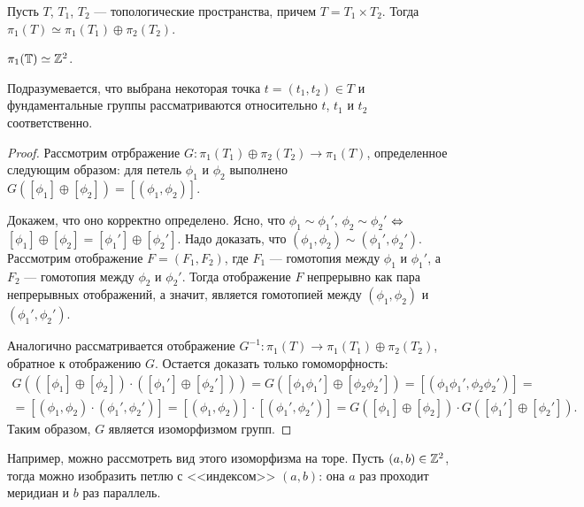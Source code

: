\documentclass[main]{subfiles}
\begin{document}
\begin{theorem}
	Пусть $ T $, $ T_1 $, $ T_2 $ --- топологические пространства, причем $ T = T_1 \times T_2 $.
	Тогда $ \pi_1(T) \simeq \pi_1(T_1) \oplus \pi_2(T_2) $.
\end{theorem}

\begin{corollary}
	$ \pi_1(\mathbb{T}) \simeq \mathbb{Z}^2 $.
\end{corollary}

\begin{remark}
	Подразумевается, что выбрана некоторая точка $ t = (t_1, t_2) \in T $ и фундаментальные группы рассматриваются
	относительно $ t $, $ t_1 $ и $ t_2 $ соответственно.
\end{remark}

\begin{proof}
	Рассмотрим отрбражение $ G \colon \pi_1(T_1) \oplus \pi_2(T_2) \to \pi_1(T) $, определенное следующим образом:
	для петель $ \phi_1 $ и $ \phi_2 $ выполнено $ G([\phi_1] \oplus [\phi_2]) = [(\phi_1, \phi_2)] $.

	Докажем, что оно корректно определено. Ясно, что $ \phi_1 \sim \phi_1' $, $ \phi_2 \sim \phi_2' $ $ \Leftrightarrow $
	$ [\phi_1] \oplus [\phi_2] = [\phi_1'] \oplus [\phi_2'] $. Надо доказать, что
	$ (\phi_1, \phi_2) \sim (\phi_1', \phi_2') $. Рассмотрим отображение $ F = (F_1, F_2) $, где $ F_1 $ --- гомотопия
	между $ \phi_1 $ и $ \phi_1' $, а $ F_2 $ --- гомотопия между $ \phi_2 $ и $ \phi_2' $. Тогда отображение $ F $
	непрерывно как пара непрерывных отображений, а значит, является гомотопией между $ (\phi_1, \phi_2) $ и
	$ (\phi_1', \phi_2') $.

	Аналогично рассматривается отображение $ G^{-1} \colon \pi_1(T) \to \pi_1(T_1) \oplus \pi_2(T_2) $, обратное к
	отображению $ G $. Остается доказать только гомоморфность:
	\begin{multline*}
		G(([\phi_1] \oplus [\phi_2]) \cdot ([\phi_1'] \oplus [\phi_2']))
		= G([\phi_1 \phi_1'] \oplus [\phi_2 \phi_2'])
		= [(\phi_1 \phi_1', \phi_2 \phi_2')]
		= \\
		= [(\phi_1, \phi_2) \cdot (\phi_1', \phi_2')]
		= [(\phi_1, \phi_2)] \cdot [(\phi_1', \phi_2')]
		= G([\phi_1] \oplus [\phi_2]) \cdot G([\phi_1'] \oplus [\phi_2']).
	\end{multline*}
	Таким образом, $ G $ является изоморфизмом групп.
\end{proof}

Например, можно рассмотреть вид этого изоморфизма на торе. Пусть $ (a, b) \in \mathbb{Z}^2 $, тогда можно изобразить петлю
с <<индексом>> $ (a, b) $: она $ a $ раз проходит меридиан и $ b $ раз параллель.
\end{document}
